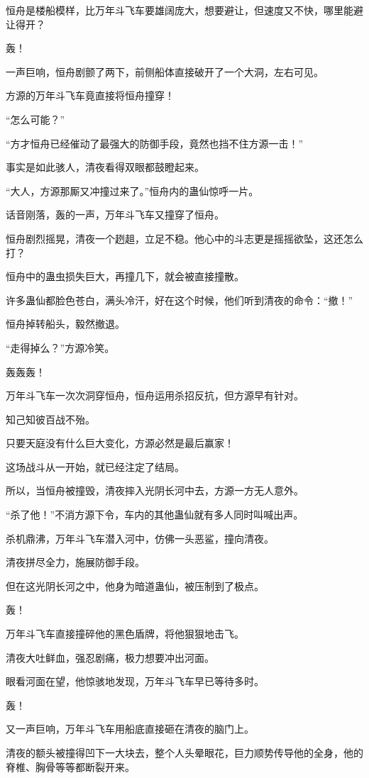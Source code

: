 \begin{this_body}
恒舟是楼船模样，比万年斗飞车要雄阔庞大，想要避让，但速度又不快，哪里能避让得开？

轰！

一声巨响，恒舟剧颤了两下，前侧船体直接破开了一个大洞，左右可见。

方源的万年斗飞车竟直接将恒舟撞穿！

“怎么可能？”

“方才恒舟已经催动了最强大的防御手段，竟然也挡不住方源一击！”

事实是如此骇人，清夜看得双眼都鼓瞪起来。

“大人，方源那厮又冲撞过来了。”恒舟内的蛊仙惊呼一片。

话音刚落，轰的一声，万年斗飞车又撞穿了恒舟。

恒舟剧烈摇晃，清夜一个趔趄，立足不稳。他心中的斗志更是摇摇欲坠，这还怎么打？

恒舟中的蛊虫损失巨大，再撞几下，就会被直接撞散。

许多蛊仙都脸色苍白，满头冷汗，好在这个时候，他们听到清夜的命令：“撤！”

恒舟掉转船头，毅然撤退。

“走得掉么？”方源冷笑。

轰轰轰！

万年斗飞车一次次洞穿恒舟，恒舟运用杀招反抗，但方源早有针对。

知己知彼百战不殆。

只要天庭没有什么巨大变化，方源必然是最后赢家！

这场战斗从一开始，就已经注定了结局。

所以，当恒舟被撞毁，清夜摔入光阴长河中去，方源一方无人意外。

“杀了他！”不消方源下令，车内的其他蛊仙就有多人同时叫喊出声。

杀机鼎沸，万年斗飞车潜入河中，仿佛一头恶鲨，撞向清夜。

清夜拼尽全力，施展防御手段。

但在这光阴长河之中，他身为暗道蛊仙，被压制到了极点。

轰！

万年斗飞车直接撞碎他的黑色盾牌，将他狠狠地击飞。

清夜大吐鲜血，强忍剧痛，极力想要冲出河面。

眼看河面在望，他惊骇地发现，万年斗飞车早已等待多时。

轰！

又一声巨响，万年斗飞车用船底直接砸在清夜的脑门上。

清夜的额头被撞得凹下一大块去，整个人头晕眼花，巨力顺势传导他的全身，他的脊椎、胸骨等等都断裂开来。


\end{this_body}

